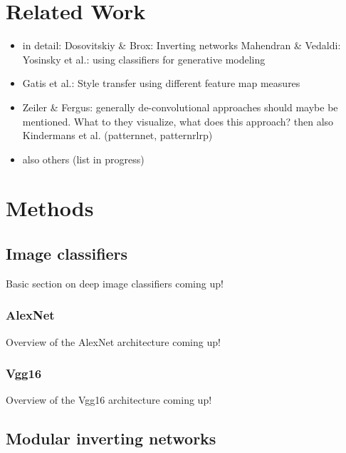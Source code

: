 \documentclass{article}
\begin{document}
\section{Related Work}

\begin{itemize}
	\item in detail:
		\subitem Dosovitskiy \& Brox: Inverting networks \cite{dobro_inverting, dobro_deepsim}
		\subitem Mahendran \& Vedaldi: \cite{mv15, mv16}
		\subitem Yosinsky et al.: using classifiers for generative modeling \cite{plugnplay}
	\item Gatis et al.: Style transfer using different feature map measures \cite{gatys_style}
	\item Zeiler \& Fergus: generally de-convolutional approaches should maybe be mentioned. What to they visualize, what does this approach? \cite{zeiler_fergus}
		\subitem then also Kindermans et al. (patternnet, patternrlrp) \cite{patternnet}
	\item also others (list in progress)
\end{itemize}


\section{Methods}

\subsection{Image classifiers}

Basic section on deep image classifiers coming up!

\subsubsection{AlexNet}

Overview of the AlexNet architecture coming up!

\subsubsection{Vgg16}

Overview of the Vgg16 architecture coming up!

\subsection{Modular inverting networks}
\end{document}
